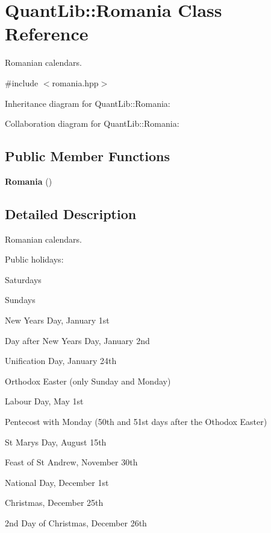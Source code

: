 \section{Quant\+Lib\+:\+:Romania Class Reference}
\label{class_quant_lib_1_1_romania}


Romanian calendars.  




{\ttfamily \#include $<$romania.\+hpp$>$}



Inheritance diagram for Quant\+Lib\+:\+:Romania\+:


Collaboration diagram for Quant\+Lib\+:\+:Romania\+:
\subsection*{Public Member Functions}
\begin{DoxyCompactItemize}
\item 
{\bf Romania} ()
\end{DoxyCompactItemize}


\subsection{Detailed Description}
Romanian calendars. 

Public holidays\+: 
\begin{DoxyItemize}
\item Saturdays 
\item Sundays 
\item New Year\textquotesingle{}s Day, January 1st 
\item Day after New Year\textquotesingle{}s Day, January 2nd 
\item Unification Day, January 24th 
\item Orthodox Easter (only Sunday and Monday) 
\item Labour Day, May 1st 
\item Pentecost with Monday (50th and 51st days after the Othodox Easter) 
\item St Marys Day, August 15th 
\item Feast of St Andrew, November 30th 
\item National Day, December 1st 
\item Christmas, December 25th 
\item 2nd Day of Christmas, December 26th 
\end{DoxyItemize}

